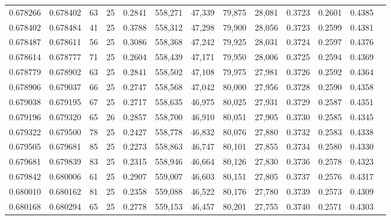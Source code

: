 \begin{tabular}{rrrrrrrrrrrrr}
0.678266 & 0.678402 &    63 &  25 &                                     0.2841 & 558,271 &  47,339 &  79,875 &  28,081 & 0.3723 & 0.2601 & 0.4385 \\
0.678402 & 0.678484 &    41 &  25 &                                     0.3788 & 558,312 &  47,298 &  79,900 &  28,056 & 0.3723 & 0.2599 & 0.4381 \\
0.678487 & 0.678611 &    56 &  25 &                                     0.3086 & 558,368 &  47,242 &  79,925 &  28,031 & 0.3724 & 0.2597 & 0.4376 \\
0.678614 & 0.678777 &    71 &  25 &                                     0.2604 & 558,439 &  47,171 &  79,950 &  28,006 & 0.3725 & 0.2594 & 0.4369 \\
0.678779 & 0.678902 &    63 &  25 &                                     0.2841 & 558,502 &  47,108 &  79,975 &  27,981 & 0.3726 & 0.2592 & 0.4364 \\
0.678906 & 0.679037 &    66 &  25 &                                     0.2747 & 558,568 &  47,042 &  80,000 &  27,956 & 0.3728 & 0.2590 & 0.4358 \\
0.679038 & 0.679195 &    67 &  25 &                                     0.2717 & 558,635 &  46,975 &  80,025 &  27,931 & 0.3729 & 0.2587 & 0.4351 \\
0.679196 & 0.679320 &    65 &  26 &                                     0.2857 & 558,700 &  46,910 &  80,051 &  27,905 & 0.3730 & 0.2585 & 0.4345 \\
0.679322 & 0.679500 &    78 &  25 &                                     0.2427 & 558,778 &  46,832 &  80,076 &  27,880 & 0.3732 & 0.2583 & 0.4338 \\
0.679505 & 0.679681 &    85 &  25 &                                     0.2273 & 558,863 &  46,747 &  80,101 &  27,855 & 0.3734 & 0.2580 & 0.4330 \\
0.679681 & 0.679839 &    83 &  25 &                                     0.2315 & 558,946 &  46,664 &  80,126 &  27,830 & 0.3736 & 0.2578 & 0.4323 \\
0.679842 & 0.680006 &    61 &  25 &                                     0.2907 & 559,007 &  46,603 &  80,151 &  27,805 & 0.3737 & 0.2576 & 0.4317 \\
0.680010 & 0.680162 &    81 &  25 &                                     0.2358 & 559,088 &  46,522 &  80,176 &  27,780 & 0.3739 & 0.2573 & 0.4309 \\
0.680168 & 0.680294 &    65 &  25 &                                     0.2778 & 559,153 &  46,457 &  80,201 &  27,755 & 0.3740 & 0.2571 & 0.4303 \\

\end{tabular}
